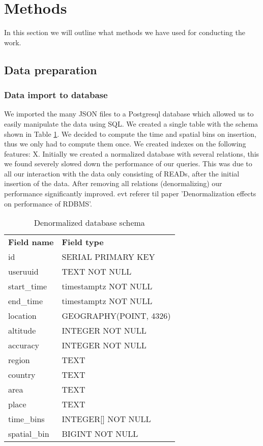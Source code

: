 \section{Methods}
In this section we will outline what methods we have used for conducting the work.
\subsection{Data preparation}
\subsubsection{Data import to database}
We imported the many JSON files to a Postgresql database which allowed us to easily manipulate the data using SQL. We created a single table with the schema shown in Table \ref{table:schema_denormalized}. We decided to compute the time and spatial bins on insertion, thus we only had to compute them once. We created indexes on the following features: X.
Initially we created a normalized database with several relations, this we found severely slowed down the performance of our queries. This was due to all our interaction with the data only consisting of READs, after the initial insertion of the data. After removing all relations (denormalizing) our performance significantly improved. {\color{red} evt referer til paper 'Denormalization effects on performance of RDBMS'}.
\begin{table}[ht]
\centering
\caption{Denormalized database schema}
\label{my-label}
\begin{tabular}{ll}
\textbf{Field name} & \textbf{Field type}    \\
id                  & SERIAL PRIMARY KEY     \\
useruuid            & TEXT NOT NULL          \\
start\_time         & timestamptz NOT NULL   \\
end\_time           & timestamptz NOT NULL   \\
location            & GEOGRAPHY(POINT, 4326) \\
altitude            & INTEGER NOT NULL       \\
accuracy            & INTEGER NOT NULL       \\
region              & TEXT                   \\
country             & TEXT                   \\
area                & TEXT                   \\
place               & TEXT                   \\
time\_bins          & INTEGER{[}{]} NOT NULL \\
spatial\_bin        & BIGINT NOT NULL       
\end{tabular}
\label{table:schema_denormalized}
\end{table}

